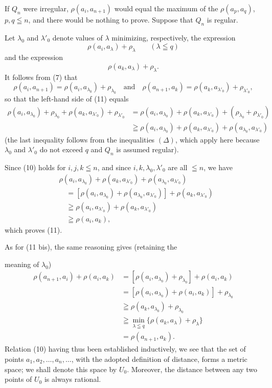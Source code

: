 \documentclass[a4paper,12pt]{amsart}
\newcommand{\srcpage}[1]{} %
\begin{document}
If $Q_n$ were irregular, $\rho(a_i,a_{n+1})$ would equal the maximum of the $\rho(a_p,a_q)$, $p,q\leqq n$, and there would be nothing to prove. Suppose that $Q_n$ is regular.

Let $\lambda_0$ and $\lambda'_0$ denote values of $\lambda$ minimizing, respectively, the expression
\[
\rho(a_i,a_\lambda)+\rho_\lambda\qquad(\lambda\leqq q)
\]
and the expression
\[
\rho(a_k,a_\lambda)+\rho_\lambda.
\]
It follows from (7) that
\[
\rho(a_i,a_{n+1})=\rho(a_i,a_{\lambda_0})+\rho_{\lambda_0}
\quad\text{and}\quad
\rho(a_{n+1},a_k)=\rho(a_k,a_{\lambda'_0})+\rho_{\lambda'_0},
\]
so that the left-hand side of (11) equals
{\small
\begin{equation}\tag{12}
\begin{aligned}
\rho(a_i,a_{\lambda_0})+\rho_{\lambda_0}+\rho(a_k,a_{\lambda'_0})+\rho_{\lambda'_0}
&=\rho(a_i,a_{\lambda_0})+\rho(a_k,a_{\lambda'_0})+(\rho_{\lambda_0}+\rho_{\lambda'_0})\\
&\geqq\rho(a_i,a_{\lambda_0})+\rho(a_k,a_{\lambda'_0})+\rho(a_{\lambda_0},a_{\lambda'_0})
\end{aligned}
\end{equation}
}
(the last inequality follows from the inequalities $(\Delta)$, which apply here because $\lambda_0$ and $\lambda'_0$ do not exceed $q$ and $Q_n$ is assumed regular).

Since (10) holds for $i,j,k\leqq n$, and since $i,k,\lambda_0,\lambda'_0$ are all $\leqq n$, we have
\begin{equation}\tag{13}
\begin{aligned}
&\rho(a_i,a_{\lambda_0})+\rho(a_k,a_{\lambda'_0})+\rho(a_{\lambda_0},a_{\lambda'_0})\\
&\quad=[\rho(a_i,a_{\lambda_0})+\rho(a_{\lambda_0},a_{\lambda'_0})]+\rho(a_k,a_{\lambda'_0})\\
&\quad\geqq\rho(a_i,a_{\lambda'_0})+\rho(a_k,a_{\lambda'_0})\\
&\quad\geqq\rho(a_i,a_k),
\end{aligned}
\end{equation}
which proves (11).

As for (11 bis), the same reasoning gives (retaining the
\srcpage{56}
meaning of $\lambda_0$)
\[
\begin{aligned}
\rho(a_{n+1},a_i)+\rho(a_i,a_k)
&=[\rho(a_i,a_{\lambda_0})+\rho_{\lambda_0}]+\rho(a_i,a_k)\\
&=[\rho(a_i,a_{\lambda_0})+\rho(a_i,a_k)]+\rho_{\lambda_0}\\
&\geqq\rho(a_k,a_{\lambda_0})+\rho_{\lambda_0}\\
&\geqq\min_{\lambda\leqq q}\{\rho(a_k,a_\lambda)+\rho_\lambda\}\\
&=\rho(a_{n+1},a_k).
\end{aligned}
\]
Relation (10) having thus been established inductively, we see that the set of points $a_1,a_2,\dots,a_n,\dots$, with the adopted definition of distance, forms a metric space; we shall denote this space by $U_0$. Moreover, the distance between any two points of $U_0$ is always rational.
\end{document}
